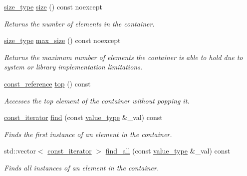 \begin{DoxyCompactItemize}
\hyperlink{classcrsc_1_1priority__queue_a2b1c9a55084026111d70a4fe869e0fbe}{size\+\_\+type} \hyperlink{classcrsc_1_1priority__queue_af2e208f5e6d7de9bce98ab6f225107aa}{size} () const  noexcept
\begin{DoxyCompactList}\small\item\em Returns the number of elements in the container. \end{DoxyCompactList}\item 
\hyperlink{classcrsc_1_1priority__queue_a2b1c9a55084026111d70a4fe869e0fbe}{size\+\_\+type} \hyperlink{classcrsc_1_1priority__queue_a38a462a9b04c8bd8e96deed40e8022f8}{max\+\_\+size} () const  noexcept
\begin{DoxyCompactList}\small\item\em Returns the maximum number of elements the container is able to hold due to system or library implementation limitations. \end{DoxyCompactList}\item 
\hyperlink{classcrsc_1_1priority__queue_a654551a6a31b69c37ee6bac13b22d262}{const\+\_\+reference} \hyperlink{classcrsc_1_1priority__queue_a69fa407b73905801ebceb4b857484247}{top} () const 
\begin{DoxyCompactList}\small\item\em Accesses the top element of the container without popping it. \end{DoxyCompactList}\item 
\hyperlink{classcrsc_1_1priority__queue_a35736d93262db4fdd6d4a71bf785f9b9}{const\+\_\+iterator} \hyperlink{classcrsc_1_1priority__queue_af2ca2cc288875dd4fda147260055b81d}{find} (const \hyperlink{classcrsc_1_1priority__queue_a2a7d77c9465b6c918f67021e6eb926d7}{value\+\_\+type} \&\+\_\+val) const 
\begin{DoxyCompactList}\small\item\em Finds the first instance of an element in the container. \end{DoxyCompactList}\item 
std\+::vector$<$ \hyperlink{classcrsc_1_1priority__queue_a35736d93262db4fdd6d4a71bf785f9b9}{const\+\_\+iterator} $>$ \hyperlink{classcrsc_1_1priority__queue_ae0d4ae80ad39510a1b70e8dcdccf6aaa}{find\+\_\+all} (const \hyperlink{classcrsc_1_1priority__queue_a2a7d77c9465b6c918f67021e6eb926d7}{value\+\_\+type} \&\+\_\+val) const 
\begin{DoxyCompactList}\small\item\em Finds all instances of an element in the container. \end{DoxyCompactList}\item 

\end{DoxyCompactItemize}
